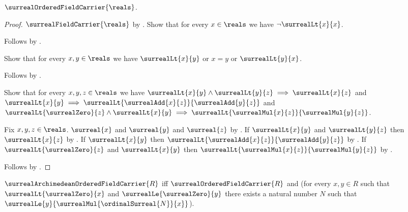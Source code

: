 \begin{theorem}\label{surreal_reals_ordered_field_carrier}
    $\surrealOrderedFieldCarrier{\reals}$.
\end{theorem}
\begin{proof}
    $\surrealFieldCarrier{\reals}$
        by .
    Show that for every $x\in\reals$ we have
        $\lnot\surrealLt{x}{x}$.
    \begin{subproof}
        Follows by
            .
    \end{subproof}
    Show that for every $x,y\in\reals$ we have
        $\surrealLt{x}{y}$ or $x=y$ or $\surrealLt{y}{x}$.
    \begin{subproof}
        Follows by .
    \end{subproof}
    Show that for every $x,y,z\in\reals$ we have
        $\surrealLt{x}{y}\land\surrealLt{y}{z}
            \implies\surrealLt{x}{z}$ and
        $\surrealLt{x}{y}\implies
            \surrealLt{\surrealAdd{x}{z}}{\surrealAdd{y}{z}}$ and
        $\surrealLt{\surrealZero}{z}\land\surrealLt{x}{y}
            \implies
            \surrealLt{\surrealMul{x}{z}}{\surrealMul{y}{z}}$.
    \begin{subproof}
        Fix $x,y,z\in\reals$.
        $\surreal{x}$ and $\surreal{y}$ and $\surreal{z}$
            by .
        If $\surrealLt{x}{y}$ and $\surrealLt{y}{z}$ then
            $\surrealLt{x}{z}$
            by .
        If $\surrealLt{x}{y}$ then
            $\surrealLt{\surrealAdd{x}{z}}{\surrealAdd{y}{z}}$
            by .
        If $\surrealLt{\surrealZero}{z}$ and
            $\surrealLt{x}{y}$ then
            $\surrealLt{\surrealMul{x}{z}}{\surrealMul{y}{z}}$
            by .
    \end{subproof}
    Follows by .
\end{proof}

\begin{definition}\label{surreal_archimedean_ordered_field_carrier}
    $\surrealArchimedeanOrderedFieldCarrier{R}$ iff
        $\surrealOrderedFieldCarrier{R}$ and
        (for every $x,y\in R$ such that
            $\surrealLt{\surrealZero}{x}$ and
            $\surrealLe{\surrealZero}{y}$ there exists a natural number
            $N$ such that
            $\surrealLe{y}{\surrealMul{\ordinalSurreal{N}}{x}}$).
\end{definition}

